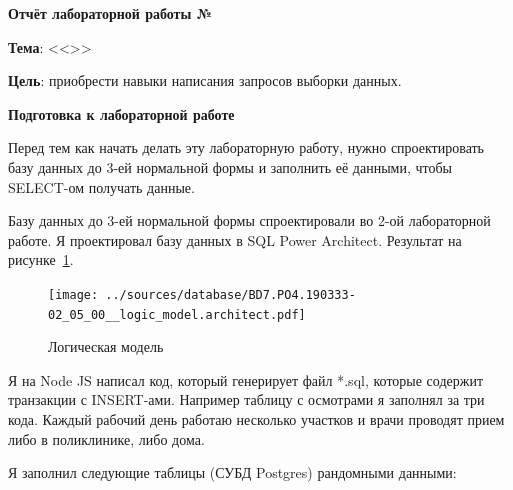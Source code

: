 \begin{center}
  \textbf{Отчёт лабораторной работы №\envReportLabNumber}
\end{center}

\textbf{Тема}:
<<\envReportTitle>>

\textbf{Цель}: приобрести навыки написания запросов выборки данных.


\begin{center}
  \textbf{Подготовка к лабораторной работе}
\end{center}

Перед тем как начать делать эту лабораторную работу, нужно спроектировать базу данных до 3-ей нормальной формы
и заполнить её данными, чтобы SELECT-ом получать данные.

Базу данных до 3-ей нормальной формы спроектировали во 2-ой лабораторной работе.
Я проектировал базу данных в SQL Power Architect. Результат на рисунке~\ref{fig:database}.

\begin{figure}[!h]
  \centering

  \texttt{[image: ../sources/database/BD7.PO4.190333-02\_05\_00\_\_logic\_model.architect.pdf]}

  \caption{Логическая модель}

  \label{fig:database}
\end{figure}

Я на Node JS написал код, который генерирует файл *.sql, которые содержит транзакции с INSERT-ами.
Например таблицу с осмотрами я заполнял за три кода.
Каждый рабочий день работаю несколько участков и врачи проводят прием либо в поликлинике, либо дома.

Я заполнил следующие таблицы (СУБД Postgres) рандомными данными:

